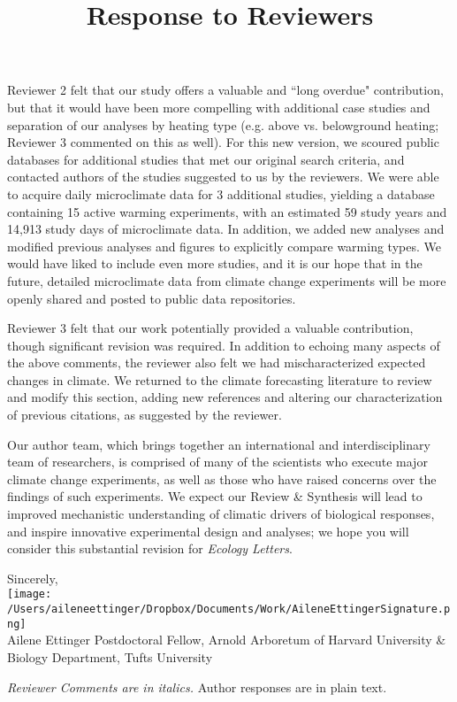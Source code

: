 \documentclass[11pt,a4paper]{letter}
\begin{document}
\begin{letter}{}
Reviewer 2 felt that our study offers a valuable and ``long overdue" contribution, but that it would have been more compelling with additional case studies and separation of our analyses by heating type (e.g. above vs. belowground heating; Reviewer 3 commented on this as well). For this new version, we scoured public databases for additional studies that met our original search criteria, and contacted authors of the studies suggested to us by the reviewers. We were able to acquire daily microclimate data for 3 additional studies, yielding a database containing 15 active warming experiments, with an estimated 59 study years and 14,913 study days of microclimate data. In addition, we added new analyses and modified previous analyses and figures to explicitly compare warming types.  We would have liked to include even more studies, and it is our hope that in the future, detailed microclimate data from climate change experiments will be more openly shared and posted to public data repositories. 

Reviewer 3 felt that our work potentially provided a valuable contribution, though significant revision was required.  In addition to echoing many aspects of the above comments, the reviewer also felt we had mischaracterized expected changes in climate. We returned to the climate forecasting literature to review and modify this section, adding new references and altering our characterization of previous citations, as suggested by the reviewer. 

Our author team, which brings together an international and interdisciplinary team of researchers, is comprised of many of the scientists who execute major climate change experiments, as well as those who have raised concerns over the findings of such experiments.  We expect our Review \& Synthesis will lead to improved mechanistic understanding of climatic drivers of biological responses, and inspire innovative experimental design and analyses; we hope you will consider this substantial revision for \emph{Ecology Letters}.

Sincerely,\\

\texttt{[image: /Users/aileneettinger/Dropbox/Documents/Work/AileneEttingerSignature.png]} \\
Ailene Ettinger
Postdoctoral Fellow, Arnold Arboretum of Harvard University \& Biology Department, Tufts University


\clearpage
\title{Response to Reviewers}
 \emph{Reviewer Comments are in italics.} Author responses are in plain text.


\end{letter}
\end{document}
